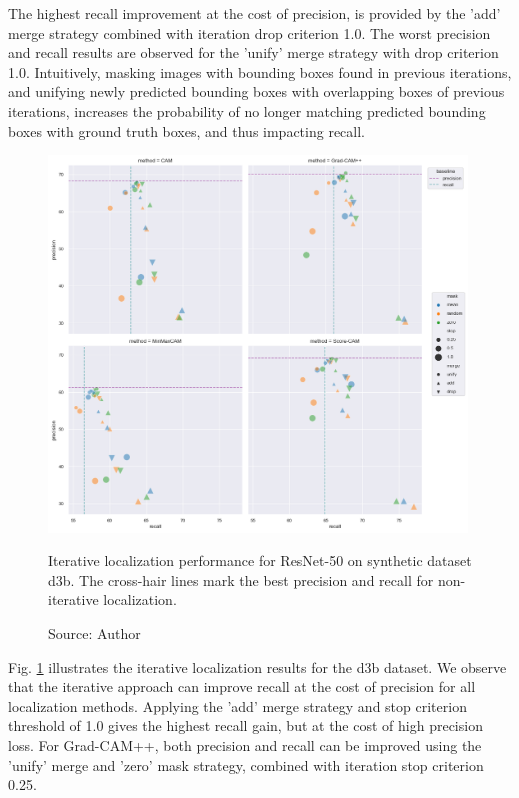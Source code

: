 The highest recall improvement at the cost of precision, is provided by the 'add' merge strategy combined with iteration drop criterion 1.0. The worst precision and recall results are observed for the 'unify' merge strategy with drop criterion 1.0. Intuitively, masking images with bounding boxes found in previous iterations, and unifying newly predicted bounding boxes with overlapping boxes of previous iterations, increases the probability of no longer matching predicted bounding boxes with ground truth boxes, and thus impacting recall.

\begin{figure}[h]
    \begin{center}       
    \includegraphics[width=0.99\textwidth]{images/fig_iter_resnet50_syn_d3b.png}
    \caption[Iterative localization performance for ResNet-50 on synthetic dataset d3b]{Iterative localization performance for ResNet-50 on synthetic dataset d3b. The cross-hair lines mark the best precision and recall for non-iterative localization.}
    \caption*{Source: Author}
    \label{fig:prec_iter_resnet50_syn_d3b}
    \end{center}
\end{figure}

Fig. \ref{fig:prec_iter_resnet50_syn_d3b} illustrates the iterative localization results for the d3b dataset. We observe that the iterative approach can improve recall at the cost of precision for all localization methods. Applying the 'add' merge strategy and stop criterion threshold of 1.0 gives the highest recall gain, but at the cost of high precision loss. For Grad-CAM++, both precision and recall can be improved using the 'unify' merge and 'zero' mask strategy, combined with iteration stop criterion 0.25.

